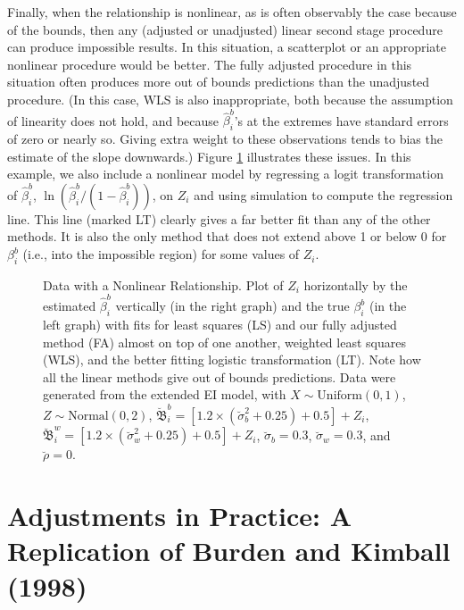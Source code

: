 \documentclass[11pt,titlepage]{article}
\newcommand{\bbeta}{{\mathfrak B}}
\newcommand{\sigmau}{\breve{\sigma}}
\newcommand{\rhou}{\breve{\rho}}
\begin{document}
Finally, when the relationship is nonlinear, as is often observably
the case because of the bounds, then any (adjusted or unadjusted)
linear second stage procedure can produce impossible results.  In this
situation, a scatterplot or an appropriate nonlinear procedure would
be better.  The fully adjusted procedure in this situation often
produces more out of bounds predictions than the unadjusted procedure.
(In this case, WLS is also inappropriate, both because the assumption
of linearity does not hold, and because $\hat\beta_i^b$'s at the
extremes have standard errors of zero or nearly so.  Giving extra
weight to these observations tends to bias the estimate of the slope
downwards.)  Figure \ref{f:nonlinear} illustrates these issues.  In
this example, we also include a nonlinear model by regressing a logit
transformation of $\hat\beta_i^b$,
$\ln(\hat\beta_i^b/(1-\hat\beta_i^b))$, on $Z_i$ and using simulation
to compute the regression line.  This line (marked LT) clearly gives a
far better fit than any of the other methods.  It is also the only
method that does not extend above 1 or below 0 for $\beta_i^b$ (i.e.,
into the impossible region) for some values of $Z_i$.
\begin{figure}[t]
  \begin{center}
    \caption{Data with a Nonlinear Relationship.  Plot of $Z_i$ 
      horizontally by the estimated $\hat\beta_i^b$ vertically (in the
      right graph) and the true $\beta_i^b$ (in the left graph) with
      fits for least squares (LS) and our fully adjusted method (FA)
      almost on top of one another, weighted least squares (WLS), and
      the better fitting logistic transformation (LT).  Note how all
      the linear methods give out of bounds predictions.  Data were
      generated from the extended EI model, with $X \sim
      \textrm{Uniform}(0,1)$, $Z \sim \textrm{Normal}(0,2)$,
      $\breve\bbeta_i^b = [1.2 \times (\sigmau_b^2 + 0.25) + 0.5] +
      Z_i$, $\breve\bbeta_i^w = [1.2 \times (\sigmau_w^2 + 0.25) +
      0.5] + Z_i$, $\sigmau_b = 0.3$, $\sigmau_w = 0.3$, and
      $\rhou = 0$.}
    \label{f:nonlinear}
  \end{center}
\end{figure}

\section{Adjustments in Practice: A Replication of Burden and Kimball (1998)}
\end{document}

